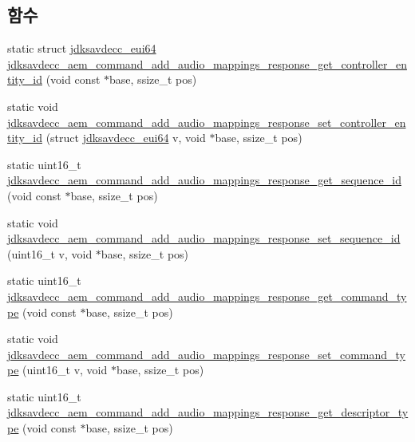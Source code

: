 \subsection*{함수}
\begin{DoxyCompactItemize}
\item 
static struct \hyperlink{structjdksavdecc__eui64}{jdksavdecc\+\_\+eui64} \hyperlink{group__command__add__audio__mappings__response_ga5fb6c88e7ab028da8e8ba71b156c32d5}{jdksavdecc\+\_\+aem\+\_\+command\+\_\+add\+\_\+audio\+\_\+mappings\+\_\+response\+\_\+get\+\_\+controller\+\_\+entity\+\_\+id} (void const $\ast$base, ssize\+\_\+t pos)
\item 
static void \hyperlink{group__command__add__audio__mappings__response_ga58fdc1b62ba8011162e0fb60cb1040df}{jdksavdecc\+\_\+aem\+\_\+command\+\_\+add\+\_\+audio\+\_\+mappings\+\_\+response\+\_\+set\+\_\+controller\+\_\+entity\+\_\+id} (struct \hyperlink{structjdksavdecc__eui64}{jdksavdecc\+\_\+eui64} v, void $\ast$base, ssize\+\_\+t pos)
\item 
static uint16\+\_\+t \hyperlink{group__command__add__audio__mappings__response_ga8d016d1b6491d03e437aa627a8666d1c}{jdksavdecc\+\_\+aem\+\_\+command\+\_\+add\+\_\+audio\+\_\+mappings\+\_\+response\+\_\+get\+\_\+sequence\+\_\+id} (void const $\ast$base, ssize\+\_\+t pos)
\item 
static void \hyperlink{group__command__add__audio__mappings__response_gae897973b616207fff6f6c562fdf9dd55}{jdksavdecc\+\_\+aem\+\_\+command\+\_\+add\+\_\+audio\+\_\+mappings\+\_\+response\+\_\+set\+\_\+sequence\+\_\+id} (uint16\+\_\+t v, void $\ast$base, ssize\+\_\+t pos)
\item 
static uint16\+\_\+t \hyperlink{group__command__add__audio__mappings__response_ga2a79b6eeda65caa6a6c6a3f64da1df72}{jdksavdecc\+\_\+aem\+\_\+command\+\_\+add\+\_\+audio\+\_\+mappings\+\_\+response\+\_\+get\+\_\+command\+\_\+type} (void const $\ast$base, ssize\+\_\+t pos)
\item 
static void \hyperlink{group__command__add__audio__mappings__response_gad834f1ded56873abe764e70631972dcf}{jdksavdecc\+\_\+aem\+\_\+command\+\_\+add\+\_\+audio\+\_\+mappings\+\_\+response\+\_\+set\+\_\+command\+\_\+type} (uint16\+\_\+t v, void $\ast$base, ssize\+\_\+t pos)
\item 
static uint16\+\_\+t \hyperlink{group__command__add__audio__mappings__response_ga608374a64878861178106de48db53a1d}{jdksavdecc\+\_\+aem\+\_\+command\+\_\+add\+\_\+audio\+\_\+mappings\+\_\+response\+\_\+get\+\_\+descriptor\+\_\+type} (void const $\ast$base, ssize\+\_\+t pos)

\end{DoxyCompactItemize}

